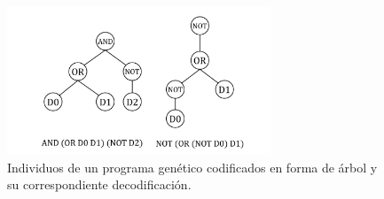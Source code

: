 \documentclass[spanish,a4paper,12pt,twoside]{report}
\begin{document}
    \begin{figure}[H]
      \centering
      \includegraphics[width = 0.7\textwidth]{resources/Fig2.pdf}
      \caption{Individuos de un programa genético codificados en forma de árbol y su correspondiente decodificación.}
      \label{fig:2}
    \end{figure} \par
  
\end{document}
